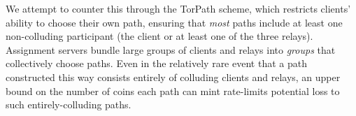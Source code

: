 We attempt to counter this through the TorPath scheme, which restricts clients'
ability to choose their own path, ensuring that {\em most} paths include at
least one non-colluding participant (the client or at least one of the three
relays). Assignment servers bundle large groups of clients and relays into {\em
groups} that collectively choose paths. Even in the relatively rare event that a
path constructed this way consists entirely of colluding clients and relays, an
upper bound on the number of coins each path can mint rate-limits potential loss
to such entirely-colluding paths.